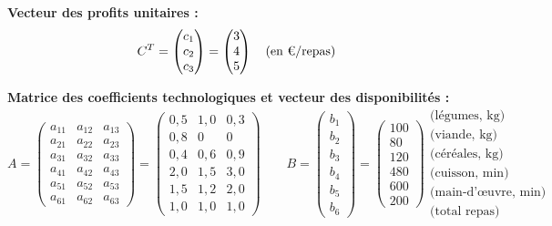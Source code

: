 \documentclass[12pt,a4paper]{article}
\begin{document}
\medskip
\noindent\textbf{Vecteur des profits unitaires :}
\[
C^T = \begin{pmatrix} c_1 \\ c_2 \\ c_3 \end{pmatrix}
    = \begin{pmatrix} 3 \\ 4 \\ 5 \end{pmatrix}
\quad (\text{en \texteuro/repas})
\]

\noindent\textbf{Matrice des coefficients technologiques et vecteur des disponibilités :}
\[
A = \begin{pmatrix}
a_{11} & a_{12} & a_{13} \\
a_{21} & a_{22} & a_{23} \\
a_{31} & a_{32} & a_{33} \\
a_{41} & a_{42} & a_{43} \\
a_{51} & a_{52} & a_{53} \\
a_{61} & a_{62} & a_{63}
\end{pmatrix}
=
\begin{pmatrix}
0{,}5 & 1{,}0 & 0{,}3 \\
0{,}8 & 0     & 0     \\
0{,}4 & 0{,}6 & 0{,}9 \\
2{,}0 & 1{,}5 & 3{,}0 \\
1{,}5 & 1{,}2 & 2{,}0 \\
1{,}0 & 1{,}0 & 1{,}0
\end{pmatrix}
\qquad
B = \begin{pmatrix} b_1 \\ b_2 \\ b_3 \\ b_4 \\ b_5 \\ b_6 \end{pmatrix}
=
\begin{pmatrix} 100 \\ 80 \\ 120 \\ 480 \\ 600 \\ 200 \end{pmatrix}
\begin{array}{l}
\text{(légumes, kg)}\\
\text{(viande, kg)}\\
\text{(céréales, kg)}\\
\text{(cuisson, min)}\\
\text{(main-d'œuvre, min)}\\
\text{(total repas)}
\end{array}
\]
\end{document}
